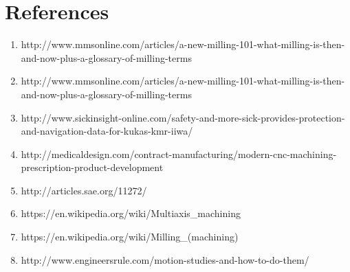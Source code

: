 \documentclass{book}
\begin{document}
\chapter*{References}
\begin{enumerate}
	
	\item http://www.mmsonline.com/articles/a-new-milling-101-what-milling-is-then-and-now-plus-a-glossary-of-milling-terms 
	\item http://www.mmsonline.com/articles/a-new-milling-101-what-milling-is-then-and-now-plus-a-glossary-of-milling-terms 
	\item http://www.sickinsight-online.com/safety-and-more-sick-provides-protection-and-navigation-data-for-kukas-kmr-iiwa/ 
	\item http://medicaldesign.com/contract-manufacturing/modern-cnc-machining-prescription-product-development 
   	\item http://articles.sae.org/11272/ 
	\item https://en.wikipedia.org/wiki/Multiaxis\_machining 
	\item https://en.wikipedia.org/wiki/Milling\_(machining) 
	\item http://www.engineersrule.com/motion-studies-and-how-to-do-them/


\end{enumerate}
\end{document}
